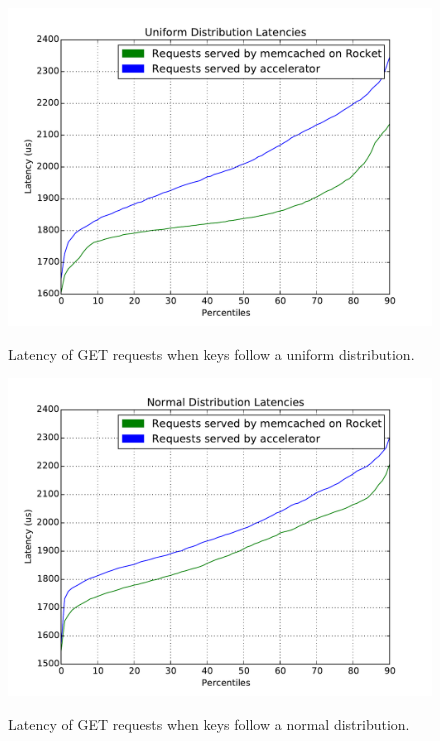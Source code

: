 \begin{figure}[t]
\begin{center}
\label{fig:unif}
\includegraphics[width=\linewidth]{unif.pdf}
\caption{Latency of GET requests when keys follow a uniform distribution.}
\end{center}
\end{figure}

\begin{figure}[t]
\begin{center}
\label{fig:norm}
\includegraphics[width=\linewidth]{norm.pdf}
\caption{Latency of GET requests when keys follow a normal distribution.}
\end{center}
\end{figure}


